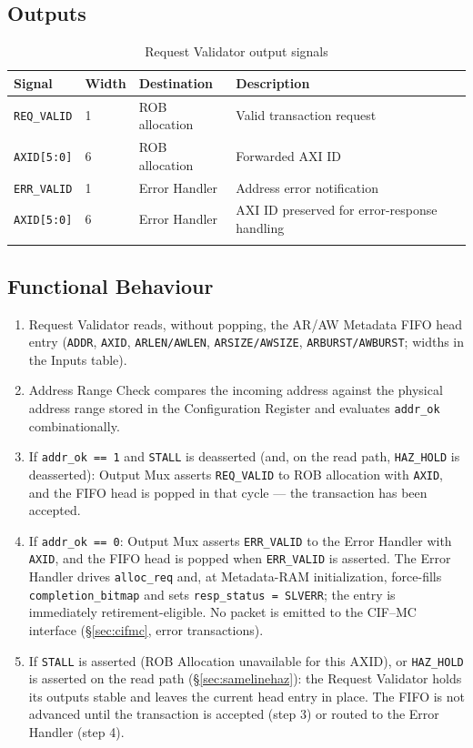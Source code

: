 \subsection{Outputs}

\begin{longtable}{llll}
\toprule
\textbf{Signal} & \textbf{Width} & \textbf{Destination} & \textbf{Description} \\
\midrule
\texttt{REQ\_VALID}       & 1 & ROB allocation & Valid transaction request \\
\texttt{AXID[5:0]}        & 6 & ROB allocation & Forwarded AXI ID \\
\texttt{ERR\_VALID}       & 1 & Error Handler & Address error notification \\
\texttt{AXID[5:0]}        & 6 & Error Handler & AXI ID preserved for error-response handling \\
\bottomrule
\caption{Request Validator output signals}
\end{longtable}

\subsection{Functional Behaviour}

\begin{enumerate}
  \item Request Validator reads, without popping, the AR/AW Metadata FIFO
        head entry (\texttt{ADDR}, \texttt{AXID}, \texttt{ARLEN/AWLEN},
        \texttt{ARSIZE/AWSIZE}, \texttt{ARBURST/AWBURST}; widths in the
        Inputs table).
  \item Address Range Check compares the incoming address against the physical address range stored in the Configuration Register and evaluates \texttt{addr\_ok} combinationally.
  \item If \texttt{addr\_ok == 1} and \texttt{STALL} is deasserted (and, on
        the read path, \texttt{HAZ\_HOLD} is deasserted):
        Output Mux asserts \texttt{REQ\_VALID} to ROB allocation
        with \texttt{AXID}, and the FIFO head is popped in that cycle
        --- the transaction has been accepted.
  \item If \texttt{addr\_ok == 0}: Output Mux asserts \texttt{ERR\_VALID}
        to the Error Handler with \texttt{AXID}, and the FIFO head is
        popped when \texttt{ERR\_VALID} is asserted. The Error Handler
        drives \texttt{alloc\_req} and, at Metadata-RAM initialization,
        force-fills \texttt{completion\_bitmap} and sets
        \texttt{resp\_status = SLVERR}; the entry is immediately
        retirement-eligible. No packet is emitted to the CIF--MC interface
        (\S\ref{sec:cifmc}, error transactions).
  \item If \texttt{STALL} is asserted (ROB Allocation unavailable for this
        AXID), or \texttt{HAZ\_HOLD} is asserted on the read path
        (\S\ref{sec:samelinehaz}): the Request Validator holds its outputs
        stable and leaves the current head entry in place. The FIFO is not
        advanced until the transaction is accepted (step 3) or routed to
        the Error Handler (step 4).
\end{enumerate}

